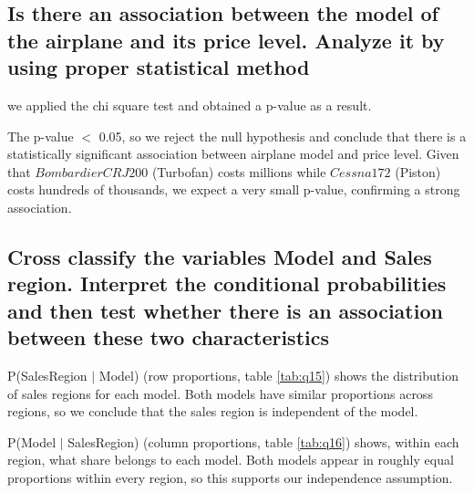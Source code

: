 \subsection[Q1-j]{Is there an association between the model of the airplane and its price level. Analyze it by using proper statistical method} 

we applied the chi square test and obtained a p-value as a result.

The p-value $<$ 0.05, so we reject the null hypothesis and conclude that there is a statistically significant association between airplane model and price level. Given that $Bombardier CRJ200$ (Turbofan) costs millions while $Cessna 172$ (Piston) costs hundreds of thousands, we expect a very small p-value, confirming a strong association.

\subsection[Q1-k]{Cross classify the variables Model and Sales region. Interpret the conditional probabilities and then test whether there is an association between these two characteristics}

P(SalesRegion $\vert$ Model) (row proportions, table \ref{tab:q15}) shows the distribution of sales regions for each model. Both models have similar proportions across regions, so we conclude that the sales region is independent of the model.

\begin{table}[H]
    \centering
    \caption{Conditional probabilities: P(SalesRegion $\vert$ Model)}
    \label{tab:q15}
\end{table}

P(Model $\vert$ SalesRegion) (column proportions, table \ref{tab:q16}) shows, within each region, what share belongs to each model. Both models appear in roughly equal proportions within every region, so this supports our independence assumption.

